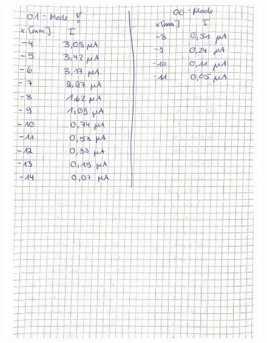 \begin{figure}[H]
  \centering
  \includegraphics[width=\textwidth]{"Messwerte/V61Messdaten_03.pdf"}
  \label{fig:Messungen_3}
\end{figure}

